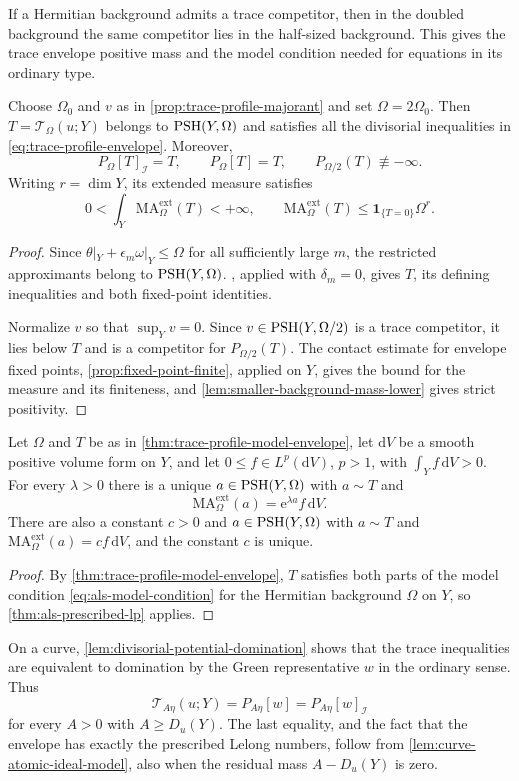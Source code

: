 If a Hermitian background admits a trace competitor, then in the doubled background the same competitor lies in the half-sized background. This gives the trace envelope positive mass and the model condition needed for equations in its ordinary type.

\begin{theorem}\label{thm:trace-profile-model-envelope}
Choose $\Omega_0$ and $v$ as in \cref{prop:trace-profile-majorant} and set $\Omega=2\Omega_0$. Then $T=\mathcal T_\Omega(u;Y)$ belongs to $\mathrm{PSH}(Y,\Omega)$ and satisfies all the divisorial inequalities in \eqref{eq:trace-profile-envelope}. Moreover,
\[
 P_\Omega[T]_{\mathcal I}=T,\qquad P_\Omega[T]=T,
 \qquad P_{\Omega/2}(T)\not\equiv-\infty.
\]
Writing $r=\dim Y$, its extended measure satisfies
\[
 0<\int_Y\mathrm{MA}^{\mathrm{ext}}_\Omega(T)<+\infty,
 \qquad
 \mathrm{MA}^{\mathrm{ext}}_\Omega(T)
 \leq\mathbf1_{\{T=0\}}\Omega^r.
\]
\end{theorem}
\begin{proof}
Since $\theta|_Y+\epsilon_m\omega|_Y\leq\Omega$ for all sufficiently large $m$, the restricted approximants belong to $\mathrm{PSH}(Y,\Omega)$. , applied with $\delta_m=0$, gives $T$, its defining inequalities and both fixed-point identities.

Normalize $v$ so that $\sup_Yv=0$. Since $v\in\mathrm{PSH}(Y,\Omega/2)$ is a trace competitor, it lies below $T$ and is a competitor for $P_{\Omega/2}(T)$. The contact estimate for envelope fixed points, \cref{prop:fixed-point-finite}, applied on $Y$, gives the bound for the measure and its finiteness, and \cref{lem:smaller-background-mass-lower} gives strict positivity.
\end{proof}

\begin{corollary}\label{cor:trace-envelope-prescribed-equation}
Let $\Omega$ and $T$ be as in \cref{thm:trace-profile-model-envelope}, let $\mathrm{d}V$ be a smooth positive volume form on $Y$, and let $0\leq f\in L^p(\mathrm{d}V)$, $p>1$, with $\int_Y f\,\mathrm{d}V>0$. For every $\lambda>0$ there is a unique $a\in\mathrm{PSH}(Y,\Omega)$ with $a\sim T$ and
\[
 \mathrm{MA}^{\mathrm{ext}}_\Omega(a)=\mathrm{e}^{\lambda a}f\,\mathrm{d}V.
\]
There are also a constant $c>0$ and $a\in\mathrm{PSH}(Y,\Omega)$ with $a\sim T$ and $\mathrm{MA}^{\mathrm{ext}}_\Omega(a)=cf\,\mathrm{d}V$, and the constant $c$ is unique.
\end{corollary}
\begin{proof}
By \cref{thm:trace-profile-model-envelope}, $T$ satisfies both parts of the model condition \eqref{eq:als-model-condition} for the Hermitian background $\Omega$ on $Y$, so \cref{thm:als-prescribed-lp} applies.
\end{proof}

On a curve, \cref{lem:divisorial-potential-domination} shows that the trace inequalities are equivalent to domination by the Green representative $w$ in the ordinary sense. Thus
\[
 \mathcal T_{A\eta}(u;Y)=P_{A\eta}[w]=P_{A\eta}[w]_{\mathcal I}
\]
for every $A>0$ with $A\geq D_u(Y)$. The last equality, and the fact that the envelope has exactly the prescribed Lelong numbers, follow from \cref{lem:curve-atomic-ideal-model}, also when the residual mass $A-D_u(Y)$ is zero.
